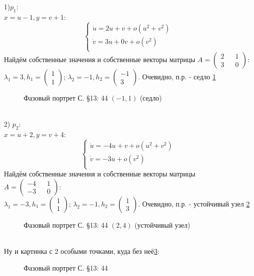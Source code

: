 \documentclass{article}
\begin{document}
1)$p_1$:\\
$x=u-1,y=v+1$:
\begin{equation}
\begin{cases}
        \dot{u}=2u+v+o(u^2+v^2)\\
        \dot{v}=3u+0v+o(v^2)\\
    \end{cases}    
\end{equation}
Найдём собственные значения и собственные векторы матрицы $A=\begin{pmatrix} 2 && 1 \\ 3 && 0 \end{pmatrix}$:\\
 $\lambda_1=3,
 h_1 = \begin{pmatrix} 1 \\  1 \end{pmatrix} $; 
 $\lambda_2= -1,
 h_2 = \begin{pmatrix} -1 \\  3 \end{pmatrix} $. 
 Очевидно, п.р. - седло \ref{13.44.1}
 \begin{figure}[ht]
\caption{Фазовый портрет С. \S13: 44 $(-1,1)$ (седло)}
\label{13.44.1}
\end{figure}\\  
2) $p_2$:\\
$x=u+2,y=v+4$:
\begin{equation}
\begin{cases}
        \dot{u}=-4u+v+o(u^2+v^2)\\
        \dot{v}=-3u+o(v^2)\\
    \end{cases}    
\end{equation}
Найдём собственные значения и собственные векторы матрицы $A=\begin{pmatrix} -4 && 1 \\ -3 && 0 \end{pmatrix}$:\\
 $\lambda_1=-3,
 h_1 = \begin{pmatrix} 1 \\  1 \end{pmatrix} $; 
 $\lambda_2= -1,
 h_2 = \begin{pmatrix} 1 \\  3 \end{pmatrix} $. 
 Очевидно, п.р. - устойчивый узел \ref{13.44.2}
 \begin{figure}[ht]
\caption{Фазовый портрет С. \S13: 44 $(2,4)$ (устойчивый узел)}
\label{13.44.2}
\end{figure}\\  
Ну и картинка с 2 особыми точками, куда без неё\ref{13.44.3}:\\
 \begin{figure}[ht]
\caption{Фазовый портрет С. \S13: 44}
\label{13.44.3}
\end{figure}\\
\end{document}

